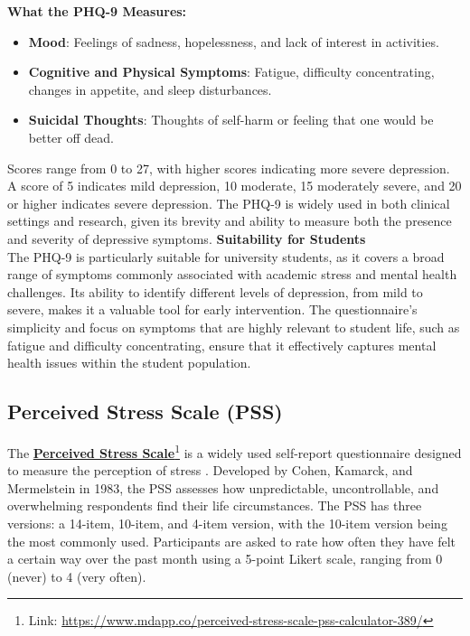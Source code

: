 \noindent \textbf{What the PHQ-9 Measures:}
\begin{itemize}
    \item \textbf{Mood}: Feelings of sadness, hopelessness, and lack of interest in activities.
    \item \textbf{Cognitive and Physical Symptoms}: Fatigue, difficulty concentrating, changes in appetite, and sleep disturbances.
    \item \textbf{Suicidal Thoughts}: Thoughts of self-harm or feeling that one would be better off dead.
\end{itemize}
Scores range from 0 to 27, with higher scores indicating more severe depression. A score of 5 indicates mild depression, 10 moderate, 15 moderately severe, and 20 or higher indicates severe depression. The PHQ-9 is widely used in both clinical settings and research, given its brevity and ability to measure both the presence and severity of depressive symptoms.\vspace{5mm}
\noindent \textbf{Suitability for Students} \\
The PHQ-9 is particularly suitable for university students, as it covers a broad range of symptoms commonly associated with academic stress and mental health challenges. Its ability to identify different levels of depression, from mild to severe, makes it a valuable tool for early intervention. The questionnaire’s simplicity and focus on symptoms that are highly relevant to student life, such as fatigue and difficulty concentrating, ensure that it effectively captures mental health issues within the student population.

\subsection{Perceived Stress Scale (PSS)}

The \textbf{\href{https://www.mdapp.co/perceived-stress-scale-pss-calculator-389/}{Perceived Stress Scale}}\footnote{Link: \url{https://www.mdapp.co/perceived-stress-scale-pss-calculator-389/}} is a widely used self-report questionnaire designed to measure the perception of stress \cite{pss-review}. Developed by Cohen, Kamarck, and Mermelstein in 1983, the PSS assesses how unpredictable, uncontrollable, and overwhelming respondents find their life circumstances. The PSS has three versions: a 14-item, 10-item, and 4-item version, with the 10-item version being the most commonly used. Participants are asked to rate how often they have felt a certain way over the past month using a 5-point Likert scale, ranging from 0 (never) to 4 (very often).\vspace{5mm}


